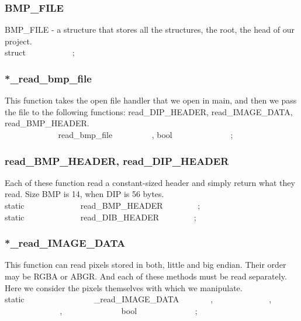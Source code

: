 \documentclass{article}
\begin{document}
\subsubsection{BMP\_FILE}
BMP\_FILE - a structure that stores all the structures, the root, the head of our project.
\\[1\baselineskip]
\colorbox{black!80}{\textcolor{orange!65}{struct} \textcolor{white}{BMP\_FILE}\textcolor{orange!65}{;}}
\subsubsection{*\_read\_bmp\_file}
This function takes the open file handler that we open in main, and then we pass the file to the following functions: read\_DIP\_HEADER, read\_IMAGE\_DATA, read\_BMP\_HEADER.
\\[1\baselineskip]
\colorbox{black!80}{\textcolor{white}{BMP\_FILE *} \textcolor{yellow!85}{read\_bmp\_file}\textcolor{white}{(FILE *file}\textcolor{orange!65}{, }\textcolor{green!65}{bool }\textcolor{white}{is\_big\_endian)}\textcolor{orange!65}{;}}
\subsubsection{read\_BMP\_HEADER, read\_DIP\_HEADER}
Each of these function read a constant-sized header and simply return what they read. Size BMP is 14, when DIP is 56 bytes.
\\[1\baselineskip]
\colorbox{black!80}{\textcolor{orange!65}{static }\textcolor{white}{BMP\_FILE *} \textcolor{yellow!85}{read\_BMP\_HEADER}\textcolor{white}{(FILE *f)}\textcolor{orange!65}{;}}
\\
\colorbox{black!80}{\textcolor{orange!65}{static }\textcolor{white}{BMP\_FILE *} \textcolor{yellow!85}{read\_DIB\_HEADER}\textcolor{white}{(FILE *f)}\textcolor{orange!65}{;}}
\subsubsection{*\_read\_IMAGE\_DATA}
This function can read pixels stored in both, little and big endian. Their order may be RGBA or ABGR. And each of these methods must be read separately. Here we consider the pixels themselves with which we manipulate.
\\[1\baselineskip]
\colorbox{black!80}{\textcolor{orange!65}{static }\textcolor{white}{IMAGE\_DATA *} \textcolor{yellow!85}{\_read\_IMAGE\_DATA}\textcolor{white}{(FILE *f}\textcolor{orange!65}{, }\textcolor{white}{uint32\_t offset}\textcolor{orange!65}{, }\textcolor{white}{uint32\_t width}\textcolor{orange!65}{, }\textcolor{white}{uint32\_t height}\textcolor{green!65}{bool }\textcolor{white}{is\_big\_endian)}\textcolor{orange!65}{;}}
\end{document}
